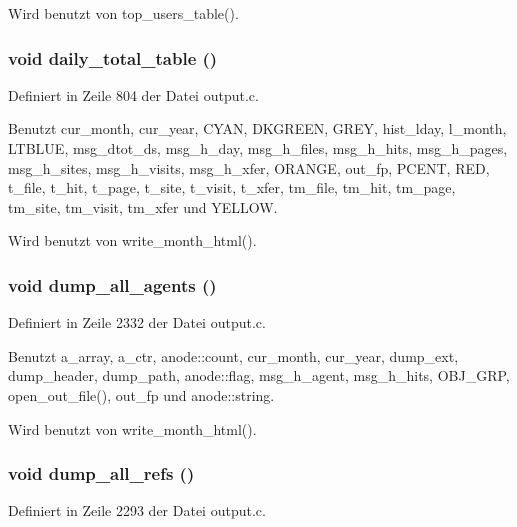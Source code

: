 Wird benutzt von top\_\-users\_\-table().
\subsubsection{\setlength{\rightskip}{0pt plus 5cm}void daily\_\-total\_\-table ()}\label{output_8c_24968f52f4cb828c450b4357d0da9326}




Definiert in Zeile 804 der Datei output.c.

Benutzt cur\_\-month, cur\_\-year, CYAN, DKGREEN, GREY, hist\_\-lday, l\_\-month, LTBLUE, msg\_\-dtot\_\-ds, msg\_\-h\_\-day, msg\_\-h\_\-files, msg\_\-h\_\-hits, msg\_\-h\_\-pages, msg\_\-h\_\-sites, msg\_\-h\_\-visits, msg\_\-h\_\-xfer, ORANGE, out\_\-fp, PCENT, RED, t\_\-file, t\_\-hit, t\_\-page, t\_\-site, t\_\-visit, t\_\-xfer, tm\_\-file, tm\_\-hit, tm\_\-page, tm\_\-site, tm\_\-visit, tm\_\-xfer und YELLOW.

Wird benutzt von write\_\-month\_\-html().
\subsubsection{\setlength{\rightskip}{0pt plus 5cm}void dump\_\-all\_\-agents ()}\label{output_8c_13b9a7e783dc0408ef406d95e9a347a8}




Definiert in Zeile 2332 der Datei output.c.

Benutzt a\_\-array, a\_\-ctr, anode::count, cur\_\-month, cur\_\-year, dump\_\-ext, dump\_\-header, dump\_\-path, anode::flag, msg\_\-h\_\-agent, msg\_\-h\_\-hits, OBJ\_\-GRP, open\_\-out\_\-file(), out\_\-fp und anode::string.

Wird benutzt von write\_\-month\_\-html().
\subsubsection{\setlength{\rightskip}{0pt plus 5cm}void dump\_\-all\_\-refs ()}\label{output_8c_246f33aca4a4783b5b9853d70aa44d61}




Definiert in Zeile 2293 der Datei output.c.

